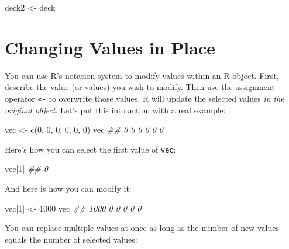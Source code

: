 \documentclass[
  letterpaper,
  DIV=11,
  numbers=noendperiod]{scrbook}
\newenvironment{Shaded}{\begin{snugshade}}{\end{snugshade}}
\newcommand{\DecValTok}[1]{\textcolor[rgb]{0.68,0.00,0.00}{#1}}
\newcommand{\DocumentationTok}[1]{\textcolor[rgb]{0.37,0.37,0.37}{\textit{#1}}}
\newcommand{\FunctionTok}[1]{\textcolor[rgb]{0.28,0.35,0.67}{#1}}
\newcommand{\NormalTok}[1]{\textcolor[rgb]{0.00,0.23,0.31}{#1}}
\newcommand{\OtherTok}[1]{\textcolor[rgb]{0.00,0.23,0.31}{#1}}
\begin{document}
\begin{Shaded}
\begin{Highlighting}[]
\NormalTok{deck2 }\OtherTok{\textless{}{-}}\NormalTok{ deck}
\end{Highlighting}
\end{Shaded}

\section{Changing Values in Place}\label{changing-values-in-place}

You can use R's notation system to modify values within an R object.
First, describe the value (or values) you wish to modify. Then use the
assignment operator \texttt{\textless{}-} to overwrite those values. R
will update the selected values \emph{in the original object}. Let's put
this into action with a real example:

\begin{Shaded}
\begin{Highlighting}[]
\NormalTok{vec }\OtherTok{\textless{}{-}} \FunctionTok{c}\NormalTok{(}\DecValTok{0}\NormalTok{, }\DecValTok{0}\NormalTok{, }\DecValTok{0}\NormalTok{, }\DecValTok{0}\NormalTok{, }\DecValTok{0}\NormalTok{, }\DecValTok{0}\NormalTok{)}
\NormalTok{vec}
\DocumentationTok{\#\#  0 0 0 0 0 0}
\end{Highlighting}
\end{Shaded}

Here's how you can select the first value of \texttt{vec}:

\begin{Shaded}
\begin{Highlighting}[]
\NormalTok{vec[}\DecValTok{1}\NormalTok{]}
\DocumentationTok{\#\#  0}
\end{Highlighting}
\end{Shaded}

And here is how you can modify it:

\begin{Shaded}
\begin{Highlighting}[]
\NormalTok{vec[}\DecValTok{1}\NormalTok{] }\OtherTok{\textless{}{-}} \DecValTok{1000}
\NormalTok{vec}
\DocumentationTok{\#\# 1000    0    0    0    0    0}
\end{Highlighting}
\end{Shaded}

You can replace multiple values at once as long as the number of new
values equals the number of selected values:
\end{document}
